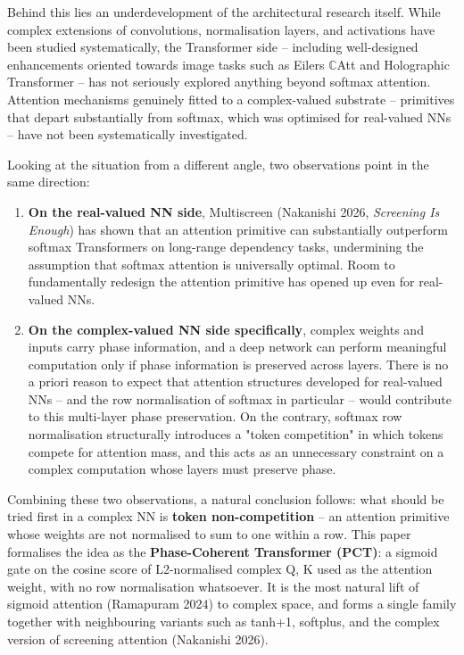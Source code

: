 \documentclass[11pt,a4paper]{article}
\theoremstyle{plain}
\theoremstyle{definition}
\begin{document}
Behind this lies an underdevelopment of the architectural research itself. While complex extensions of convolutions, normalisation layers, and activations have been studied systematically, the Transformer side -- including well-designed enhancements oriented towards image tasks such as Eilers $\mathbb{C}$Att and Holographic Transformer -- has not seriously explored anything beyond softmax attention. Attention mechanisms genuinely fitted to a complex-valued substrate -- primitives that depart substantially from softmax, which was optimised for real-valued NNs -- have not been systematically investigated.

Looking at the situation from a different angle, two observations point in the same direction:

\begin{enumerate}
  \item \textbf{On the real-valued NN side}, Multiscreen (Nakanishi 2026, \emph{Screening Is Enough}) has shown that an attention primitive can substantially outperform softmax Transformers on long-range dependency tasks, undermining the assumption that softmax attention is universally optimal. Room to fundamentally redesign the attention primitive has opened up even for real-valued NNs.
  \item \textbf{On the complex-valued NN side specifically}, complex weights and inputs carry phase information, and a deep network can perform meaningful computation only if phase information is preserved across layers. There is no a priori reason to expect that attention structures developed for real-valued NNs -- and the row normalisation of softmax in particular -- would contribute to this multi-layer phase preservation. On the contrary, softmax row normalisation structurally introduces a "token competition" in which tokens compete for attention mass, and this acts as an unnecessary constraint on a complex computation whose layers must preserve phase.
\end{enumerate}

Combining these two observations, a natural conclusion follows: what should be tried first in a complex NN is \textbf{token non-competition} -- an attention primitive whose weights are not normalised to sum to one within a row. This paper formalises the idea as the \textbf{Phase-Coherent Transformer (PCT)}: a sigmoid gate on the cosine score of L2-normalised complex Q, K used as the attention weight, with no row normalisation whatsoever. It is the most natural lift of sigmoid attention (Ramapuram 2024) to complex space, and forms a single family together with neighbouring variants such as tanh+1, softplus, and the complex version of screening attention (Nakanishi 2026).
\end{document}
